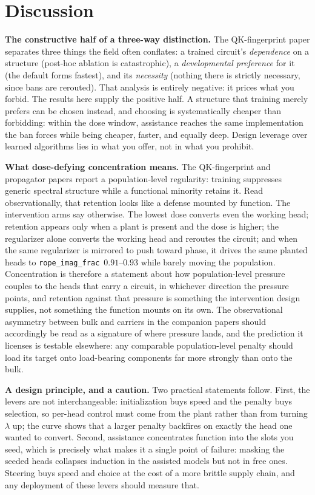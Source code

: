 \documentclass[11pt]{article}
\newcommand{\rif}{\texttt{rope\_imag\_frac}\xspace}
\begin{document}
\section{Discussion}
\textbf{The constructive half of a three-way distinction.} The QK-fingerprint paper separates three things the field
often conflates: a trained circuit's \emph{dependence} on a structure (post-hoc ablation is catastrophic), a
\emph{developmental preference} for it (the default forms fastest), and its \emph{necessity} (nothing there is
strictly necessary, since bans are rerouted). That analysis is entirely negative: it prices what you forbid. The
results here supply the positive half. A structure that training merely prefers can be chosen instead, and
choosing is systematically cheaper than forbidding: within the dose window, assistance reaches the same
implementation the ban forces while being cheaper, faster, and equally deep. Design leverage over learned
algorithms lies in what you offer, not in what you prohibit.

\textbf{What dose-defying concentration means.} The QK-fingerprint and propagator papers report a
population-level regularity: training suppresses generic spectral structure while a functional minority retains
it. Read observationally, that retention looks like a defense mounted by function. The intervention arms say
otherwise. The lowest dose converts even the working head; retention appears only when a plant is present and the
dose is higher; the regularizer alone converts the working head and reroutes the circuit; and when the same
regularizer is mirrored to push toward phase, it drives the same planted heads to \rif\ $0.91$--$0.93$ while
barely moving the population. Concentration is therefore a statement about how population-level pressure couples
to the heads that carry a circuit, in whichever direction the pressure points, and retention against that
pressure is something the intervention design supplies, not something the function mounts on its own. The
observational asymmetry between bulk and carriers in the companion papers should accordingly be read as a
signature of where pressure lands, and the prediction it licenses is testable elsewhere: any comparable
population-level penalty should load its target onto load-bearing components far more strongly than onto the
bulk.

\textbf{A design principle, and a caution.} Two practical statements follow. First, the levers are not
interchangeable: initialization buys speed and the penalty buys selection, so per-head control must come from the
plant rather than from turning $\lambda$ up; the curve shows that a larger penalty backfires on exactly the head
one wanted to convert. Second, assistance concentrates function into the slots you seed, which is precisely what makes it a
single point of failure: masking the seeded heads collapses induction in the assisted models but not in free ones.
Steering buys speed and choice at the cost of a more brittle supply chain, and any deployment of these levers
should measure that.
\end{document}
